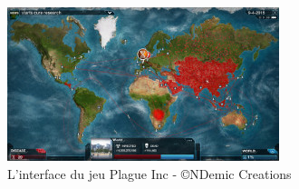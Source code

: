 \begin{figure}
\begin{center}
\includegraphics{images/plagueIncMap.jpg}
\end{center}
\caption{L'interface du jeu Plague Inc - \copyright NDemic Creations }
\label{plagueIncMap}
\end{figure}
